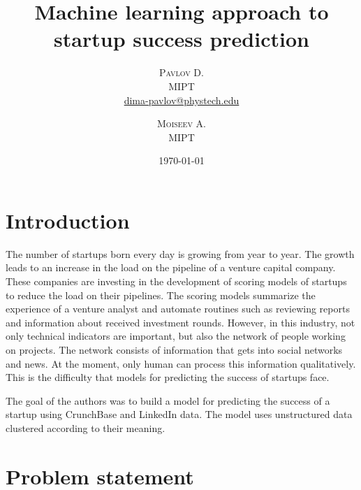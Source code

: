 \documentclass[twoside,twocolumn,12pt]{article}
\title{\textbf{\Huge{Machine learning approach to startup success prediction}}}
\author{%
\textsc{Pavlov D.} \\[1ex] 
\normalsize MIPT\\ 
\normalsize \href{mailto:dima-pavlov@phystech.edu}{dima-pavlov@phystech.edu}
\and 
\textsc{Moiseev A.} \\[1ex] 
\normalsize MIPT
}
\date{\today}
\theoremstyle{plain}
\theoremstyle{definition}
\begin{document}
\maketitle

\clearpage

\section{Introduction}



The number of startups born every day is growing from year to year. 
The growth leads to an increase in the load on the pipeline of a venture capital company. 
These companies are investing in the development of scoring models of startups to reduce the load on their pipelines. 
The scoring models summarize the experience of a venture analyst and automate routines such as reviewing reports and information about received investment rounds. %
However, in this industry, not only technical indicators are important, but also the network of people working on projects. 
The network consists of information that gets into social networks and news. 
At the moment, only human can process this information qualitatively. 
This is the difficulty that models for predicting the success of startups face. 

The goal of the authors was to build a model for predicting the success of a startup using CrunchBase and LinkedIn data. 
The model uses unstructured data clustered according to their meaning.

\section{Problem statement}

\end{document}
